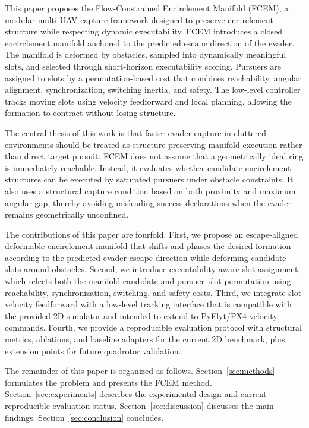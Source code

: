 \documentclass[journal]{IEEEtran}
\begin{document}
This paper proposes the Flow-Constrained Encirclement Manifold (FCEM), a modular multi-UAV capture framework designed to preserve encirclement structure while respecting dynamic executability.
FCEM introduces a closed encirclement manifold anchored to the predicted escape direction of the evader.
The manifold is deformed by obstacles, sampled into dynamically meaningful slots, and selected through short-horizon executability scoring.
Pursuers are assigned to slots by a permutation-based cost that combines reachability, angular alignment, synchronization, switching inertia, and safety.
The low-level controller tracks moving slots using velocity feedforward and local planning, allowing the formation to contract without losing structure.

The central thesis of this work is that faster-evader capture in cluttered environments should be treated as structure-preserving manifold execution rather than direct target pursuit.
FCEM does not assume that a geometrically ideal ring is immediately reachable.
Instead, it evaluates whether candidate encirclement structures can be executed by saturated pursuers under obstacle constraints.
It also uses a structural capture condition based on both proximity and maximum angular gap, thereby avoiding misleading success declarations when the evader remains geometrically unconfined.

The contributions of this paper are fourfold.
First, we propose an escape-aligned deformable encirclement manifold that shifts and phases the desired formation according to the predicted evader escape direction while deforming candidate slots around obstacles.
Second, we introduce executability-aware slot assignment, which selects both the manifold candidate and pursuer--slot permutation using reachability, synchronization, switching, and safety costs.
Third, we integrate slot-velocity feedforward with a low-level tracking interface that is compatible with the provided 2D simulator and intended to extend to PyFlyt/PX4 velocity commands.
Fourth, we provide a reproducible evaluation protocol with structural metrics, ablations, and baseline adapters for the current 2D benchmark, plus extension points for future quadrotor validation.

The remainder of this paper is organized as follows.
Section~\ref{sec:methods} formulates the problem and presents the FCEM method.
Section~\ref{sec:experiments} describes the experimental design and current reproducible evaluation status.
Section~\ref{sec:discussion} discusses the main findings.
Section~\ref{sec:conclusion} concludes.
\end{document}
